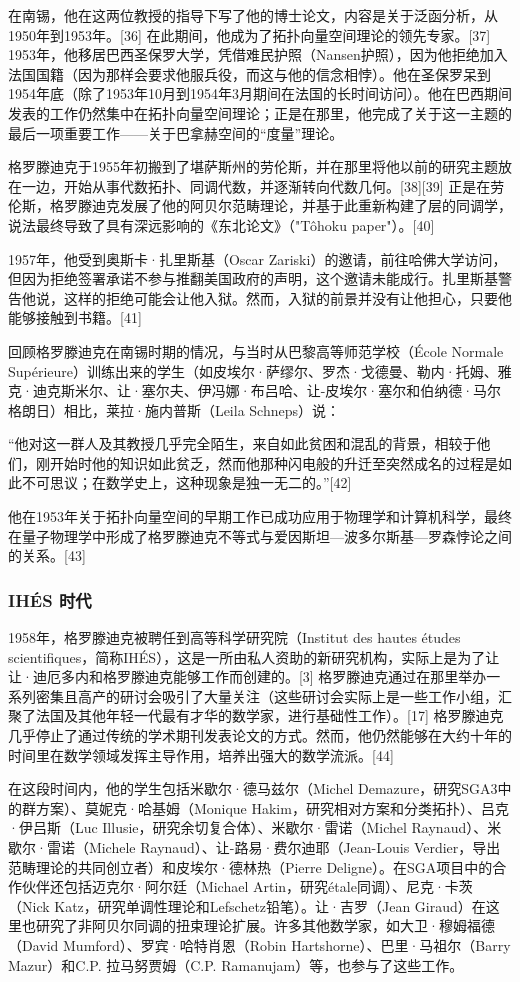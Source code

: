 在南锡，他在这两位教授的指导下写了他的博士论文，内容是关于泛函分析，从1950年到1953年。[36] 在此期间，他成为了拓扑向量空间理论的领先专家。[37] 1953年，他移居巴西圣保罗大学，凭借难民护照（Nansen护照），因为他拒绝加入法国国籍（因为那样会要求他服兵役，而这与他的信念相悖）。他在圣保罗呆到1954年底（除了1953年10月到1954年3月期间在法国的长时间访问）。他在巴西期间发表的工作仍然集中在拓扑向量空间理论；正是在那里，他完成了关于这一主题的最后一项重要工作——关于巴拿赫空间的“度量”理论。

格罗滕迪克于1955年初搬到了堪萨斯州的劳伦斯，并在那里将他以前的研究主题放在一边，开始从事代数拓扑、同调代数，并逐渐转向代数几何。[38][39] 正是在劳伦斯，格罗滕迪克发展了他的阿贝尔范畴理论，并基于此重新构建了层的同调学，说法最终导致了具有深远影响的《东北论文》（"Tôhoku paper"）。[40]

1957年，他受到奥斯卡·扎里斯基（Oscar Zariski）的邀请，前往哈佛大学访问，但因为拒绝签署承诺不参与推翻美国政府的声明，这个邀请未能成行。扎里斯基警告他说，这样的拒绝可能会让他入狱。然而，入狱的前景并没有让他担心，只要他能够接触到书籍。[41]

回顾格罗滕迪克在南锡时期的情况，与当时从巴黎高等师范学校（École Normale Supérieure）训练出来的学生（如皮埃尔·萨缪尔、罗杰·戈德曼、勒内·托姆、雅克·迪克斯米尔、让·塞尔夫、伊冯娜·布吕哈、让-皮埃尔·塞尔和伯纳德·马尔格朗日）相比，莱拉·施内普斯（Leila Schneps）说：

“他对这一群人及其教授几乎完全陌生，来自如此贫困和混乱的背景，相较于他们，刚开始时他的知识如此贫乏，然而他那种闪电般的升迁至突然成名的过程是如此不可思议；在数学史上，这种现象是独一无二的。”[42]

他在1953年关于拓扑向量空间的早期工作已成功应用于物理学和计算机科学，最终在量子物理学中形成了格罗滕迪克不等式与爱因斯坦—波多尔斯基—罗森悖论之间的关系。[43]
\subsubsection{IHÉS 时代}  
1958年，格罗滕迪克被聘任到高等科学研究院（Institut des hautes études scientifiques，简称IHÉS），这是一所由私人资助的新研究机构，实际上是为了让让·迪厄多内和格罗滕迪克能够工作而创建的。[3] 格罗滕迪克通过在那里举办一系列密集且高产的研讨会吸引了大量关注（这些研讨会实际上是一些工作小组，汇聚了法国及其他年轻一代最有才华的数学家，进行基础性工作）。[17] 格罗滕迪克几乎停止了通过传统的学术期刊发表论文的方式。然而，他仍然能够在大约十年的时间里在数学领域发挥主导作用，培养出强大的数学流派。[44]

在这段时间内，他的学生包括米歇尔·德马兹尔（Michel Demazure，研究SGA3中的群方案）、莫妮克·哈基姆（Monique Hakim，研究相对方案和分类拓扑）、吕克·伊吕斯（Luc Illusie，研究余切复合体）、米歇尔·雷诺（Michel Raynaud）、米歇尔·雷诺（Michele Raynaud）、让-路易·费尔迪耶（Jean-Louis Verdier，导出范畴理论的共同创立者）和皮埃尔·德林热（Pierre Deligne）。在SGA项目中的合作伙伴还包括迈克尔·阿尔廷（Michael Artin，研究étale同调）、尼克·卡茨（Nick Katz，研究单调性理论和Lefschetz铅笔）。让·吉罗（Jean Giraud）在这里也研究了非阿贝尔同调的扭束理论扩展。许多其他数学家，如大卫·穆姆福德（David Mumford）、罗宾·哈特肖恩（Robin Hartshorne）、巴里·马祖尔（Barry Mazur）和C.P. 拉马努贾姆（C.P. Ramanujam）等，也参与了这些工作。
